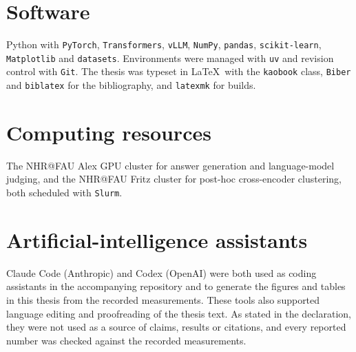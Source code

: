 \section*{Software}

Python with \texttt{PyTorch}, \texttt{Transformers}, \texttt{vLLM},
\texttt{NumPy}, \texttt{pandas}, \texttt{scikit-learn}, \texttt{Matplotlib}
and \texttt{datasets}. Environments were managed with
\texttt{uv} and revision control with \texttt{Git}. The thesis was typeset in
\LaTeX\ with the \texttt{kaobook} class, \texttt{Biber} and \texttt{biblatex}
for the bibliography, and \texttt{latexmk} for builds.

\section*{Computing resources}

The NHR@FAU Alex GPU cluster for answer generation and language-model judging,
and the NHR@FAU Fritz cluster for post-hoc cross-encoder clustering, both
scheduled with \texttt{Slurm}.

\section*{Artificial-intelligence assistants}

Claude Code (Anthropic) and Codex (OpenAI) were both used as coding assistants
in the accompanying repository and to generate the figures and tables in this
thesis from the recorded measurements. These tools also supported language
editing and proofreading of the thesis text. As stated in the declaration, they
were not used as a source of claims, results or citations, and every reported
number was checked against the recorded measurements.
\par
\endgroup
